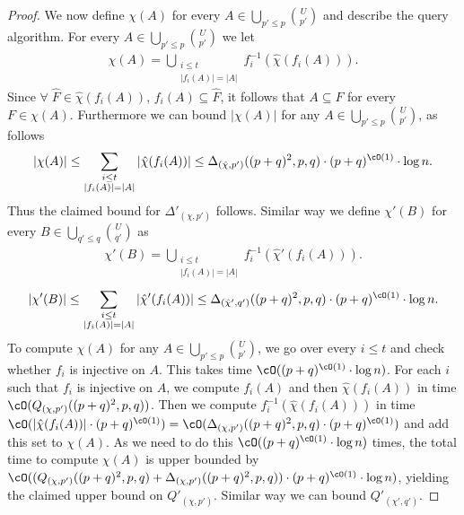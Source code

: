 \begin{proof}
 We now define $\chi(A)$ for every $A \in \bigcup_{p'\leq p}{U\choose p'}$ and describe the query algorithm. For every $A \in \bigcup_{p'\leq p}{U\choose p'}$ we let
\begin{align*} \chi(A) = \bigcup_{\substack{i\leq t \\ |f_i(A)|=|A|}} f_i^{-1}(\hat{\chi}(f_i(A))). \end{align*}
Since $\forall\;\hat{F} \in \hat{\chi}(f_i(A))$, $f_i(A) \subseteq \hat{F}$, it follows that $A \subseteq F$ for every $F \in \chi(A)$. Furthermore we can bound $|\chi(A)|$ for any $A\in \bigcup_{p'\leq p}{U\choose p'}$, 
as follows 
\begin{align*} |\chi(A)| \leq \sum_{\substack{i\leq t \\ |f_i(A)|=|A|}} |\hat{\chi}(f_i(A))| \leq \Delta_{(\hat{\chi},p')}((p+q)^2,p,q) \cdot  (p+q)^{\cO(1)} \cdot \log n.\end{align*}
Thus the claimed bound for $\Delta'_{(\chi,p')}$ follows. 
Similar way we define $\chi'(B)$ for every $B\in\bigcup_{q'\leq q}{U\choose q'}$ as 
\begin{align*} \chi'(B) = \bigcup_{\substack{i\leq t \\ |f_i(A)|=|A|}} f_i^{-1}(\hat{\chi}'(f_i(A))). \end{align*}
\begin{align*} |\chi'(B)| \leq \sum_{\substack{i\leq t \\ |f_i(A)|=|A|}} |\hat{\chi}'(f_i(A))| \leq \Delta_{(\hat{\chi}',q')}((p+q)^2,p,q) \cdot  (p+q)^{\cO(1)} \cdot \log n.\end{align*}
To compute $\chi(A)$ for any $A\in\bigcup_{p'\leq p} {U \choose p'}$, we go over every $i \leq t$ and check whether $f_i$ is injective on $A$. This takes time $\cO((p+q)^{\cO(1)} \cdot \log n)$. 
For each $i$ such that $f_i$ is injective on $A$, we compute $f_i(A)$ and then $\hat{\chi}(f_i(A))$ in time $\cO({Q_{(\chi,p')}}((p+q)^2,p,q))$. Then we compute $f_i^{-1}(\hat{\chi}(f_i(A)))$  in time 
$\cO(|\hat{\chi}(f_i(A))|\cdot (p+q)^{\cO(1)}) =\cO(\Delta_{(\chi,p')}((p+q)^2,p,q)\cdot (p+q)^{\cO(1)})$ and add this set to $\chi(A)$. As we need to do this $\cO((p+q)^{\cO(1)} \cdot \log n)$ times, the total time 
to compute $\chi(A)$ is upper bounded by $\cO(({Q_{(\chi,p')}}((p+q)^2,p,q) + \Delta_{(\chi,p')}((p+q)^2,p,q)) \cdot (p+q)^{\cO(1)} \cdot \log n)$, 
yielding the claimed upper bound on ${Q'_{(\chi,p')}}$. Similar way we can bound ${Q'_{(\chi',q')}}$.


\end{proof}
